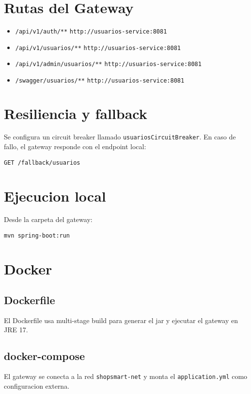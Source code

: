 \documentclass[11pt,a4paper]{article}
\begin{document}
\section{Rutas del Gateway}
\begin{itemize}
  \item \texttt{/api/v1/auth/**} \textrightarrow{} \texttt{http://usuarios-service:8081}
  \item \texttt{/api/v1/usuarios/**} \textrightarrow{} \texttt{http://usuarios-service:8081}
  \item \texttt{/api/v1/admin/usuarios/**} \textrightarrow{} \texttt{http://usuarios-service:8081}
  \item \texttt{/swagger/usuarios/**} \textrightarrow{} \texttt{http://usuarios-service:8081}
\end{itemize}

\section{Resiliencia y fallback}
Se configura un circuit breaker llamado \texttt{usuariosCircuitBreaker}. En caso de fallo, el gateway responde con el endpoint local:
\begin{lstlisting}
GET /fallback/usuarios
\end{lstlisting}

\section{Ejecucion local}
Desde la carpeta del gateway:
\begin{lstlisting}
mvn spring-boot:run
\end{lstlisting}

\section{Docker}
\subsection*{Dockerfile}
El Dockerfile usa multi-stage build para generar el jar y ejecutar el gateway en JRE 17.

\subsection*{docker-compose}
El gateway se conecta a la red \texttt{shopsmart-net} y monta el \texttt{application.yml} como configuracion externa.
\end{document}
